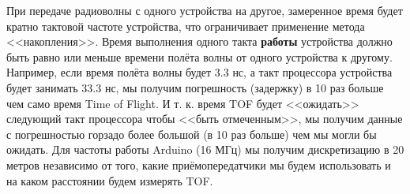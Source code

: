 При передаче радиоволны с одного устройства на другое, замеренное время будет кратно тактовой частоте устройства, что ограничивает применение метода <<накопления>>. Время выполнения одного такта \textbf{работы} устройства должно быть равно или меньше времени полёта волны от одного устройства к другому. Например, если время полёта волны будет 3.3 нс, а такт процессора устройства будет занимать 33.3 нс, мы получим погрешность (задержку) в 10 раз больше чем само время Time of Flight. И т. к. время TOF будет <<ожидать>> следующий такт процессора чтобы <<быть отмеченным>>, мы получим данные с погрешностью горзадо более большой (в 10 раз больше) чем мы могли бы ожидать. Для частоты работы Arduino (16 МГц) мы получим дискретизацию в 20 метров независимо от того, какие приёмопередатчики мы будем использовать и на каком расстоянии будем измерять TOF.
